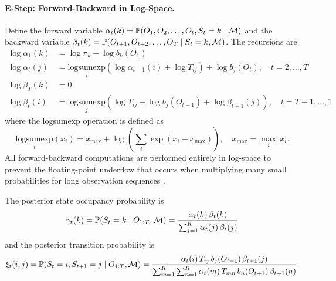 \paragraph{E-Step: Forward-Backward in Log-Space.}
Define the forward variable $\alpha_t(k) = \mathbb{P}(O_1, O_2, \ldots, O_t, S_t = k \mid \mathcal{M})$ and the backward variable $\beta_t(k) = \mathbb{P}(O_{t+1}, O_{t+2}, \ldots, O_T \mid S_t = k, \mathcal{M})$.
The recursions are
\begin{align}
    \log \alpha_1(k) &= \log \pi_k + \log b_k(O_1) \label{eq:forward_init} \\
    \log \alpha_t(j) &= \underset{i}{\text{logsumexp}}\!\left(\log \alpha_{t-1}(i) + \log T_{ij}\right) + \log b_j(O_t), \quad t = 2, \ldots, T \label{eq:forward} \\[6pt]
    \log \beta_T(k) &= 0 \label{eq:backward_init} \\
    \log \beta_t(i) &= \underset{j}{\text{logsumexp}}\!\left(\log T_{ij} + \log b_j(O_{t+1}) + \log \beta_{t+1}(j)\right), \quad t = T{-}1, \ldots, 1 \label{eq:backward}
\end{align}
where the logsumexp operation is defined as
\begin{equation}
    \underset{i}{\text{logsumexp}}(x_i) = x_{\max} + \log\!\left(\sum_{i} \exp(x_i - x_{\max})\right), \quad x_{\max} = \max_i\, x_i.
    \label{eq:logsumexp}
\end{equation}
All forward-backward computations are performed entirely in log-space to prevent the floating-point underflow that occurs when multiplying many small probabilities for long observation sequences \cite{bilmes1998gentle}.

The posterior state occupancy probability is
\begin{equation}
    \gamma_t(k) = \mathbb{P}(S_t = k \mid O_{1:T}, \mathcal{M}) = \frac{\alpha_t(k)\,\beta_t(k)}{\sum_{j=1}^{K} \alpha_t(j)\,\beta_t(j)}
    \label{eq:gamma}
\end{equation}
and the posterior transition probability is
\begin{equation}
    \xi_t(i,j) = \mathbb{P}(S_t = i, S_{t+1} = j \mid O_{1:T}, \mathcal{M}) = \frac{\alpha_t(i)\,T_{ij}\,b_j(O_{t+1})\,\beta_{t+1}(j)}{\sum_{m=1}^{K}\sum_{n=1}^{K}\alpha_t(m)\,T_{mn}\,b_n(O_{t+1})\,\beta_{t+1}(n)}.
    \label{eq:xi}
\end{equation}


